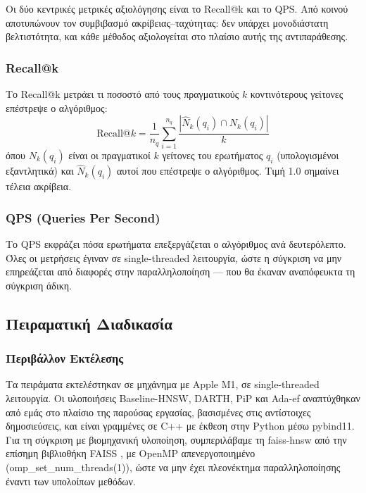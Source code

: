 \documentclass[12pt,a4paper]{article}
\begin{document}
Οι δύο κεντρικές μετρικές αξιολόγησης είναι το Recall@k και το QPS. Από κοινού αποτυπώνουν τον συμβιβασμό ακρίβειας--ταχύτητας: δεν υπάρχει μονοδιάστατη βελτιστότητα, και κάθε μέθοδος αξιολογείται στο πλαίσιο αυτής της αντιπαράθεσης.

\subsubsection{Recall@k}
Το Recall@k μετράει τι ποσοστό από τους πραγματικούς $k$ κοντινότερους γείτονες επέστρεψε ο αλγόριθμος:
\[
\text{Recall@}k = \frac{1}{n_q} \sum_{i=1}^{n_q} \frac{|\hat{N}_k(q_i) \cap N_k(q_i)|}{k}
\]
όπου $N_k(q_i)$ είναι οι πραγματικοί $k$ γείτονες του ερωτήματος $q_i$ (υπολογισμένοι εξαντλητικά) και $\hat{N}_k(q_i)$ αυτοί που επέστρεψε ο αλγόριθμος. Τιμή 1.0 σημαίνει τέλεια ακρίβεια.

\subsubsection{QPS (Queries Per Second)}
Το QPS εκφράζει πόσα ερωτήματα επεξεργάζεται ο αλγόριθμος ανά δευτερόλεπτο. Όλες οι μετρήσεις έγιναν σε single-threaded λειτουργία, ώστε η σύγκριση να μην επηρεάζεται από διαφορές στην παραλληλοποίηση --- που θα έκαναν αναπόφευκτα τη σύγκριση άδικη.

\subsection{Πειραματική Διαδικασία}

\subsubsection{Περιβάλλον Εκτέλεσης}
Τα πειράματα εκτελέστηκαν σε μηχάνημα με Apple M1, σε single-threaded λειτουργία. Οι υλοποιήσεις Baseline-HNSW, DARTH, PiP και Ada-ef αναπτύχθηκαν από εμάς στο πλαίσιο της παρούσας εργασίας, βασισμένες στις αντίστοιχες δημοσιεύσεις, και είναι γραμμένες σε C++ με έκθεση στην Python μέσω pybind11. Για τη σύγκριση με βιομηχανική υλοποίηση, συμπεριλάβαμε τη faiss-hnsw από την επίσημη βιβλιοθήκη FAISS \cite{faiss2017}, με OpenMP απενεργοποιημένο (omp\_set\_num\_threads(1)), ώστε να μην έχει πλεονέκτημα παραλληλοποίησης έναντι των υπολοίπων μεθόδων.
\end{document}
